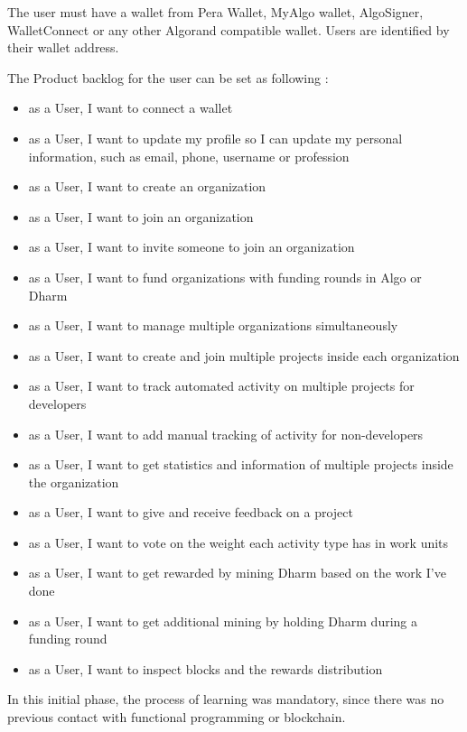 The user must have a wallet from Pera Wallet, MyAlgo wallet, AlgoSigner, WalletConnect or any other Algorand compatible wallet. Users are identified by their wallet address.\newline

The Product backlog for the user can be set as following \cite{dharma}:

\begin{itemize}
	\item as a User, I want to connect a wallet
	\item as a User, I want to update my profile so I can update my personal information, such as email, phone, username or profession
	\item as a User, I want to create an organization
	\item as a User, I want to join an organization
	\item as a User, I want to invite someone to join an organization
    \item as a User, I want to fund organizations with funding rounds in Algo or Dharm
    \item as a User, I want to manage multiple organizations simultaneously
    \item as a User, I want to create and join multiple projects inside each organization
    \item as a User, I want to track automated activity on multiple projects for developers
    \item as a User, I want to add manual tracking of activity for non-developers
    \item as a User, I want to get statistics and information of multiple projects inside the organization
    \item as a User, I want to give and receive feedback on a project
    \item as a User, I want to vote on the weight each activity type has in work units
    \item as a User, I want to get rewarded by mining Dharm based on the work I've done
	\item as a User, I want to get additional mining by holding Dharm during a funding round
    \item as a User, I want to inspect blocks and the rewards distribution
	
\end{itemize}

In this initial phase, the process of learning was mandatory, since there was no previous contact with functional programming or blockchain. \newline


